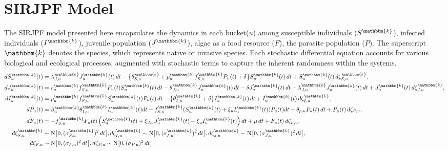 \documentclass[aoas,preprint]{imsart}\usepackage[]{graphicx}\usepackage[]{xcolor}
\newcommand\unit{u}
\newcommand\species{\mathbbm{k}}
\newcommand\Normal{\mathrm{N}}
\begin{document}
\section{SIRJPF Model}
The SIRJPF model presented here encapsulates the dynamics in each bucket($\unit$) among susceptible individuals ($S^{\species}$), infected individuals ($I^{\species}$), juvenile population ($J^{\species}$), algae as a food resource ($F$), the parasite population ($P$).
The superscript $\species$ denotes the species, which represents native or invasive species.
Each stochastic differential equation accounts for various biological and ecological processes, augmented with stochastic terms to capture the inherent randomness within the systems.
{\small
\begin{align}
    dS^{\species}_{\unit}(t) &= \lambda^{\species}_{J,{\unit}} J^{\species}_{\unit}(t) \, dt - \big\{\theta^{\species}_{S,{\unit}} + p^{\species}_{\unit} f^{\species}_{S,{\unit}} P_{\unit}(t) + \delta \big\} S^{\species}_{\unit}(t)\, dt  + S^{\species}_{\unit}(t)\, d\zeta^{\species}_{S,{\unit}}, \label{eq:SIRJPF_dS}\\
    dJ^{\species}_{\unit}(t) &= r^{\species}_{\unit}f^{\species}_{S,{\unit}}F_{\unit}(t) S^{\species}_{\unit}(t)\, dt - \theta^{\species}_{J,{\unit}} J^{\species}_{\unit}(t)\, dt - \delta J^{\species}_{\unit}(t)\, dt - \lambda^{\species}_{J,{\unit}} J^{\species}_{\unit}(t)\, dt + J^{\species}_{\unit}(t)\, d\zeta^{\species}_{J,{\unit}}, \label{eq:SIRJPF_dJ}\\
    dI^{\species}_{\unit}(t) &= p^{\species}_{\unit} f^{\species}_{S,{\unit}} S^{\species}_{\unit}(t) P_{\unit}(t)\, dt - \big\{\theta^{\species}_{I,{\unit}} + \delta \big\} I^{\species}_{\unit}(t)\, dt + I^{\species}_{\unit}(t) \, d\zeta^{\species}_{I,{\unit}}, \label{eq:SIRJPF_dI}\\
    dP_{\unit}(t) &= \beta^{\species}_{\unit} \theta^{\species}_{I,{\unit}} I^{\species}_{\unit}(t)dt - f^{\species}_{S,{\unit}} ( S^{\species}_{\unit}(t) + \xi_{\unit} I^{\species}_{\unit}(t))P_{\unit}(t) dt - \theta_{p,{\unit}} P_{\unit}(t)\, dt + P_{\unit}(t)\, d\zeta_{P,{\unit}}, \label{eq:SIRJPF_dP}\\
    dF_{\unit}(t) &= - f^{\species}_{S,{\unit}} F_{\unit}(t) \left(S^{\species}_{\unit}(t)+\xi_{J,{\unit}}J^{\species}_{\unit}(t) +\xi_{\unit} I^{\species}_{\unit}(t)\right)dt  + \mu \, dt + F_{\unit}(t)\, d\zeta_{F,{\unit}}, \label{eq:SIRJPF_dF}\\
d\zeta^{\species}_{S,{\unit}} &\sim \Normal \big[0, (\sigma^{\species}_{S,{\unit}})^{2}\, dt\big],
d\zeta^{\species}_{I,{\unit}} \sim \Normal \big[0, (\sigma^{\species}_{I,{\unit}})^{2}\, dt\big],
d\zeta^{\species}_{J,{\unit}} \sim \Normal \big[0, (\sigma^{\species}_{J,{\unit}})^{2}\, dt\big],\\
d\zeta_{F,{\unit}} &\sim \Normal \big[0, (\sigma_{F,{\unit}})^{2}\, dt\big],
d\zeta_{P,{\unit}} \sim \Normal \big[0, (\sigma_{P,{\unit}})^{2}\, dt\big].
\end{align}
}
\end{document}
